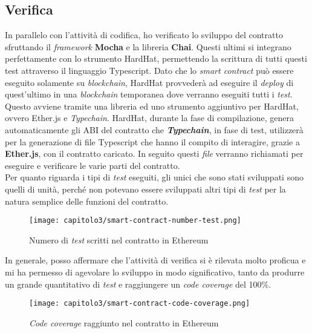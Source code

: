 \subsection{Verifica}
In parallelo con l'attività di codifica, ho verificato lo sviluppo del contratto sfruttando il \textit{framework} \textbf{Mocha} e la libreria \textbf{Chai}. Questi ultimi si integrano perfettamente con lo strumento HardHat, permettendo la scrittura di tutti questi test attraverso il linguaggio Typescript. Dato che lo \textit{smart contract} può essere eseguito solamente su \textit{blockchain}, HardHat provvederà ad eseguire il \textit{deploy} di quest'ultimo in una \textit{blockchain} temporanea dove verranno eseguiti tutti i \textit{test}. Questo avviene tramite una libreria ed uno strumento aggiuntivo per HardHat, ovvero Ether.js e \textit{Typechain}. HardHat, durante la fase di compilazione, genera automaticamente gli ABI del contratto che \textbf{\textit{Typechain}}, in fase di test, utilizzerà per la generazione di file Typescript che hanno il compito di interagire, grazie a \textbf{Ether.js}, con il contratto caricato. In seguito questi \textit{file} verranno richiamati per eseguire e verificare le varie parti del contratto. \\

Per quanto riguarda i tipi di \textit{test} eseguiti, gli unici che sono stati sviluppati sono quelli di unità, perché non potevano essere sviluppati altri tipi di \textit{test} per la natura semplice delle funzioni del contratto.

\clearpage
\begin{figure}[h!]
  \centering
  \texttt{[image: capitolo3/smart-contract-number-test.png]}
  \caption{Numero di \textit{test} scritti nel contratto in Ethereum}
\end{figure}

In generale, posso affermare che l'attività di verifica si è rilevata molto proficua e mi ha permesso di agevolare lo sviluppo in modo significativo, tanto da produrre un grande quantitativo di \textit{test} e raggiungere un \textit{code coverage} del 100\%.

\begin{figure}[h!]
  \centering
  \texttt{[image: capitolo3/smart-contract-code-coverage.png]}
  \caption{\textit{Code coverage} raggiunto nel contratto in Ethereum}
\end{figure}
